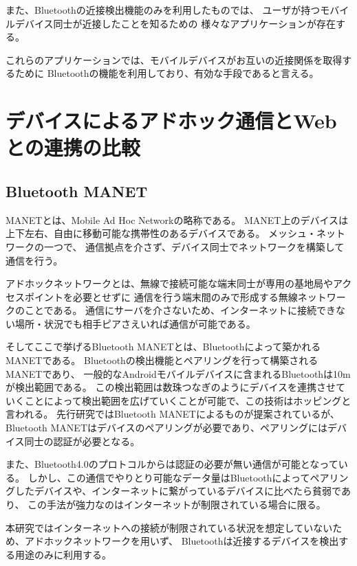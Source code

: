 また、Bluetoothの近接検出機能のみを利用したものでは、
ユーザが持つモバイルデバイス同士が近接したことを知るための
様々なアプリケーション\cite{すれちがったー}\cite{encountme}\cite{Monac}が存在する。

これらのアプリケーションでは、モバイルデバイスがお互いの近接関係を取得するために
Bluetoothの機能を利用しており、有効な手段であると言える。


\section{デバイスによるアドホック通信とWebとの連携の比較}

\subsection{Bluetooth MANET}

MANETとは、Mobile Ad Hoc Networkの略称である。
MANET上のデバイスは上下左右、自由に移動可能な携帯性のあるデバイスである。
メッシュ・ネットワークの一つで、
通信拠点を介さず、デバイス同士でネットワークを構築して通信を行う。

アドホックネットワークとは、無線で接続可能な端末同士が専用の基地局やアクセスポイントを必要とせずに
通信を行う端末間のみで形成する無線ネットワークのことである。
通信にサーバを介さないため、インターネットに接続できない場所・状況でも相手ピアさえいれば通信が可能である。

そしてここで挙げるBluetooth MANETとは、Bluetoothによって築かれるMANETである。
Bluetoothの検出機能とペアリングを行って構築されるMANETであり、
一般的なAndroidモバイルデバイスに含まれるBluetoothは10mが検出範囲である。
この検出範囲は数珠つなぎのようにデバイスを連携させていくことによって検出範囲を広げていくことが可能で、この技術はホッピングと言われる。
先行研究ではBluetooth MANETによるものが提案されているが、
Bluetooth MANETはデバイスのペアリングが必要であり、ペアリングにはデバイス同士の認証が必要となる。

また、Bluetooth4.0のプロトコルからは認証の必要が無い通信が可能となっている。
しかし、この通信でやりとり可能なデータ量はBluetoothによってペアリングしたデバイスや、インターネットに繋がっているデバイスに比べたら貧弱であり、
この手法が強力なのはインターネットが制限されている場合に限る。

本研究ではインターネットへの接続が制限されている状況を想定していないため、アドホックネットワークを用いず、
Bluetoothは近接するデバイスを検出する用途のみに利用する。
